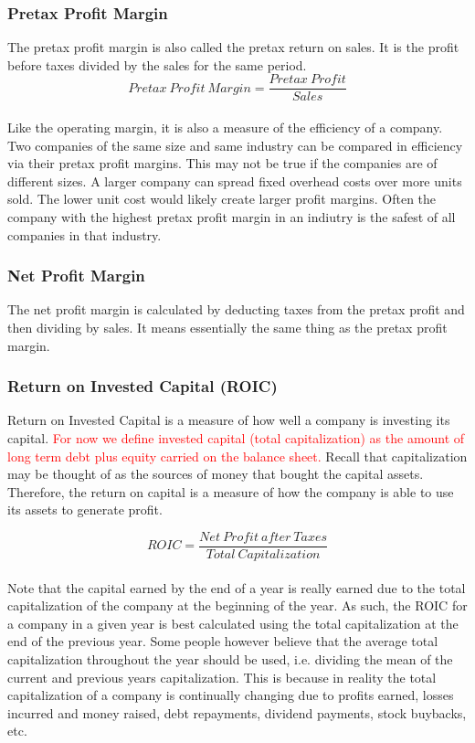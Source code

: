 \documentclass{article}
\begin{document}
\subsubsection{Pretax Profit Margin}
The pretax profit margin is also called the pretax return on sales. It is the profit before taxes divided by the sales for the same period. 
\begin{equation}
    Pretax\: Profit\: Margin = \frac{Pretax\: Profit}{Sales}
\end{equation}\\


Like the operating margin, it is also a measure of the efficiency of a company. Two companies of the same size and same industry can be compared in efficiency via their pretax profit margins. This may not be true if the companies are of different sizes. A larger company can spread fixed overhead costs over more units sold. The lower unit cost would likely create larger profit margins. Often the company with the highest pretax profit margin in an indiutry is the safest of all companies in that industry. 

\subsubsection{Net Profit Margin}
The net profit margin is calculated by deducting taxes from the pretax profit and then dividing by sales. It means essentially the same thing as the pretax profit margin. 

\subsubsection{Return on Invested Capital (ROIC)}
Return on Invested Capital is a measure of how well a company is investing its capital. \textcolor{red}{For now we define invested capital (total capitalization) as the amount of long term debt plus equity carried on the balance sheet.} Recall that capitalization may be thought of as the sources of money that bought the capital assets. Therefore, the return on capital is a measure of how the company is able to use its assets to generate profit. 

 \begin{equation}
    ROIC = \frac{Net\: Profit\: after\: Taxes}{Total\: Capitalization}
\end{equation}\\

Note that the capital earned by the end of a year is really earned due to the total capitalization of the company at the beginning of the year. As such, the ROIC for a company in a given year is best calculated using the total capitalization at the end of the previous year. Some people however believe that the average total capitalization throughout the year should be used, i.e. dividing the mean of the current and previous years capitalization. This is because in reality the total capitalization of a company is continually changing due to profits earned, losses incurred and money raised, debt repayments, dividend payments, stock buybacks, etc. 
\end{document}
